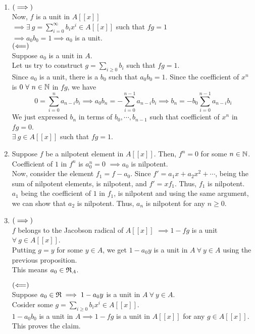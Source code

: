\begin{enumerate}
	\item
	\( \left( \implies \right) \) \\
	Now, \( f \) is a unit in \( A[[x]] \) \\
	\( \implies \exists\ g = \sum_{i=0}^{\infty} b_i x^i \in A[[x]] \)
	such that \( fg = 1 \) \\
	\( \implies a_0 b_0 = 1 \implies a_0 \) is a unit. \\

	\( \left( \Longleftarrow \right) \) \\
	Suppose \( a_0 \) is a unit in \( A \). \\
	Let us try to construct \( g = \sum_{i \geq 0} b_i \)
	such that \( fg = 1 \). \\
	Since \( a_0 \) is a unit, there is a \( b_0 \) such that
	\( a_0 b_0 = 1 \).
	Since the coefficient of \( x^n \) is \( 0\ \forall\ n \in \NN \)
	in \( fg \), we have
	\[
		0 = \sum_{i=0}^n a_{n-i} b_{i}
		\implies a_0 b_n = - \sum_{i=0}^{n-1} a_{n-i} b_{i}
		\implies b_n = - b_0 \sum_{i=0}^{n-1} a_{n-i} b_{i}
	\]
	We just expressed \( b_n \) in terms of \( b_0, \cdots, b_{n-1} \)
	such that coefficient of \( x^n \) in \( fg = 0 \). \\
	\( \exists\ g \in A[[x]] \) such that \( fg = 1 \).


	\item
	Suppose \( f \) be a nilpotent element in \( A[[x]] \).
	Then, \( f^n = 0 \) for some \( n \in \NN \). \\
	Coefficient of \( 1 \) in \( f^n \) is \( a_0^n = 0 \)
	\( \implies a_0 \) is nilpotent. \\
	Now, consider the element \( f_1 = f - a_0 \).
	Since \(f' = a_1 x + a_2 x^2 + \cdots\), being the sum of
	nilpotent elements, is nilpotent, and \(f' = xf_1\).
	Thus, \(f_1\) is nilpotent. \\
	\(a_1\) being the coefficient of \(1\) in \(f_1\), is nilpotent
	and using the same argument, we can show that \(a_2\) is nilpotent.
	Thus, \(a_n\) is nilpotent for any \(n \geq 0\).

	\item
	\( \left( \implies \right) \) \\
	\(f\) belongs to the Jacobson radical of \(A[[x]]\)
	\(\implies 1 - fg\) is a unit \(\forall\ g \in A[[x]]\). \\
	Putting \(g = y\) for some \(y \in A\), we get
	\(1 - a_0 y\) is a unit in \(A \ \forall\ y \in A\) using the
	previous proposition. \\
	This means \(a_0 \in \mathfrak{R}_A\).

	\(\left( \Longleftarrow \right)\) \\
	Suppose \(a_0 \in \mathfrak{R} \implies 1-a_0 y\) is a unit in
	\(A \ \forall\ y \in A\). \\
	Cosider some \(g = \sum_{i \geq 0} b_i x^i \in A[[x]]\). \\
	\(1-a_0 b_0\) is a unit in \(A \implies 1 - fg\) is a unit
	in \(A[[x]]\) for any \(g \in A[[x]]\). \\
	This proves the claim.
\end{enumerate}


